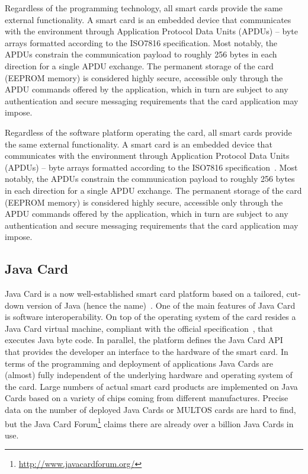 Regardless of the programming technology, all smart cards provide the
same external functionality. A smart card is an embedded device that
communicates with the environment through Application Protocol Data
Units (APDUs) -- byte arrays formatted according to the ISO7816
specification.  Most notably, the APDUs constrain the communication
payload to roughly 256 bytes in each direction for a single APDU exchange.
The permanent storage
of the card (EEPROM memory) is considered highly secure, accessible
only through the APDU commands offered by the application, which in
turn are subject to any authentication and secure messaging
requirements that the card application may impose.

Regardless of the software platform operating the card, all smart cards provide
the same external functionality. A smart card is an embedded device that
communicates with the environment through Application Protocol Data Units
(APDUs) -- byte arrays formatted according to the ISO7816
specification~\cite{ISO7816_4}. Most notably, the APDUs constrain the
communication payload to roughly 256 bytes in each direction for a single APDU
exchange. The permanent storage of the card (EEPROM memory) is considered
highly secure, accessible only through the APDU commands offered by the
application, which in turn are subject to any authentication and secure
messaging requirements that the card application may impose.

\subsection{Java Card}\label{sec:javacard}

Java Card is a now well-established smart card platform based on a
tailored, cut-down version of Java (hence the name)~\cite{Chen00}. One
of the main features of Java Card is software interoperability. On top
of the operating system of the card resides a Java Card virtual
machine, compliant with the official specification~\cite{jcvm222}, that
executes Java byte code. In parallel, the platform defines
the Java Card API~\cite{jcapi222} that provides the developer an interface
to the hardware of the smart card.
In terms of the programming and deployment of applications
Java Cards are (almost) fully independent of the underlying hardware
and operating system of the card. Large numbers of actual smart card
products are implemented on Java Cards based on a variety of chips
coming from different manufactures. Precise data on the number of deployed
Java Cards or MULTOS cards are hard to find, but the
Java Card Forum\footnote{\url{http://www.javacardforum.org/}}
claims there are already over a billion Java Cards in use.

